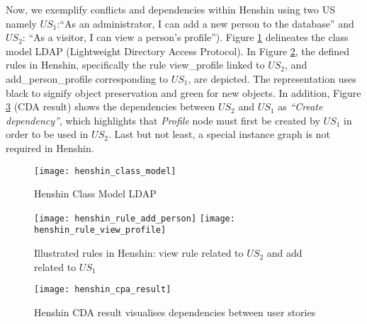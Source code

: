 \begin{example}
Now, we exemplify conflicts and dependencies within Henshin using two US namely $US_1$:\enquote{As an administrator, I can add a new person to the database} and $US_2$: \enquote{As a visitor, I can view a person's profile}). Figure \ref{fig:henshin_model} delineates the  class model LDAP (Lightweight Directory Access Protocol). In Figure \ref{fig:henshin_rule}, the defined rules in Henshin, specifically the rule view\_profile linked to $US_2$, and add\_person\_profile corresponding to $US_1$, are depicted. The representation uses black to signify object preservation and green for new objects. In addition, Figure \ref{henshin_cpa_result} (CDA result) shows the dependencies between $US_2$ and $US_1$ as \emph{\enquote{Create dependency}}, which highlights that \emph{Profile} node must first be created by $US_1$ in order to be used in $US_2$. Last but not least, a special instance graph is not required in Henshin.
\begin{figure}
\center
\texttt{[image: henshin\_class\_model]}
\caption{Henshin Class Model LDAP}\label{fig:henshin_model}
\end{figure}
\begin{figure}
\texttt{[image: henshin\_rule\_add\_person]}
\texttt{[image: henshin\_rule\_view\_profile]}
\caption{Illustrated rules in Henshin: view rule related to $US_2$ and add related to $US_1$}\label{fig:henshin_rule}
\end{figure}
\begin{figure}
\center
\texttt{[image: henshin\_cpa\_result]}
\caption{Henshin CDA result visualises dependencies between user stories}\label{henshin_cpa_result}
\end{figure}
\end{example}
